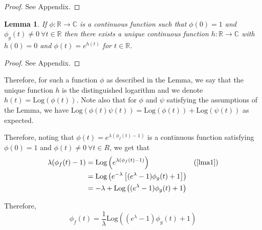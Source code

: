 \documentclass[a4paper,11pt]{article}
\theoremstyle{theorem}
\newtheorem{lem}{Lemma}[section]
\theoremstyle{definition}
\begin{document}
\begin{proof}
See Appendix.
\end{proof}

\begin{lem}
If $\phi : \mathbb{R} \to \mathbb{C}$ is a continuous function such that $\phi(0) = 1$ and $\phi_{g}(t) \neq 0 \ \forall t \in \mathbb{R}$ then there exists a unique continuous function $h : \mathbb{R} \to \mathbb{C}$ with $h(0) = 0$ and $\phi(t) = e^{h(t)}$ for $t \in \mathbb{R}$. 
\end{lem}

\begin{proof}
See Appendix.
\end{proof}

Therefore, for such a function $\phi$ as described in the Lemma, we say that the unique function $h$ is the distinguished logarithm and we denote $h(t) = \text{Log}(\phi(t))$. Note also that for $\phi$ and $\psi$ satisfying the assumptions of the Lemma, we have $\text{Log}(\phi(t)\psi(t)) = \text{Log}(\phi(t)) + \text{Log}(\psi(t))$ as expected.  

Therefore, noting that $\phi(t) = e^{\lambda(\phi_{f}(t) - 1)}$ is a continuous function satisfying $\phi(0) = 1$ and $\phi(t) \neq 0 \ \forall t \in R$, we get that
\begin{align*}
\lambda(\phi_{f}(t) - 1) &= \text{Log}\left(e^{\lambda (\phi_{f}(t) - 1)}\right)& \text{(\cref{lma1})} \\
                         &= \text{Log}\left(e^{-\lambda}\left[(e^{\lambda} - 1)\phi_{g}(t) + 1\right] \right) \\
                         &= -\lambda + \text{Log}\left((e^{\lambda} - 1)\phi_{g}(t) + 1\right)
\end{align*}

Therefore,
\begin{equation} \label{eq:charf}
\phi_{f}(t) = \frac{1}{\lambda}\text{Log}\left((e^{\lambda} - 1)\phi_{g}(t) + 1\right)
\end{equation} 
\end{document}
